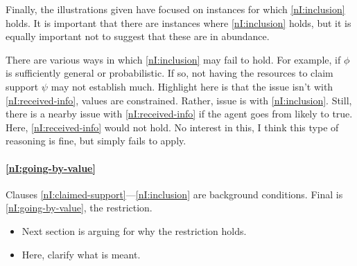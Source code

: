 \begin{note}
  Finally, the illustrations given have focused on instances for which \ref{nI:inclusion} holds.
  It is important that there are instances where \ref{nI:inclusion} holds, but it is equally important not to suggest that these are in abundance.

  There are various ways in which \ref{nI:inclusion} may fail to hold.
  For example, if \(\phi\) is sufficiently general or probabilistic.
  If so, not having the resources to claim support \(\psi\) may not establish much.
  Highlight here is that the issue isn't with \ref{nI:received-info}, values are constrained.
  Rather, issue is with \ref{nI:inclusion}.
  Still, there is a nearby issue with \ref{nI:received-info} if the agent goes from likely to true.
  Here, \ref{nI:received-info} would not hold.
  No interest in this, I think this type of reasoning is fine, but \nI{} simply fails to apply.
\end{note}

\paragraph{\ref{nI:going-by-value}}

\begin{note}
  Clauses \ref{nI:claimed-support}---\ref{nI:inclusion} are background conditions.
  Final is \ref{nI:going-by-value}, the restriction.

  \begin{itemize}
  \item Next section is arguing for why the restriction holds.
  \item Here, clarify what is meant.
  \end{itemize}
\end{note}

